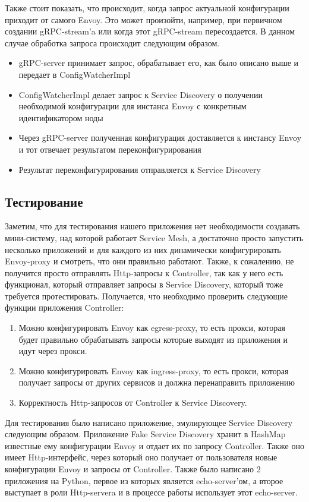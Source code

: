 Также стоит показать, что происходит, когда запрос актуальной конфигурации приходит от самого Envoy. Это может произойти, например, при первичном создании gRPC-stream'a или когда этот gRPC-stream пересоздается. В данном случае обработка запроса происходит следующим образом.

\begin{itemize}
	\item gRPC-server принимает запрос, обрабатывает его, как было описано выше и передает в ConfigWatcherImpl
	\item ConfigWatcherImpl делает запрос к Service Discovery о получении необходимой конфигурации для инстанса Envoy с конкретным идентификатором ноды
	\item Через gRPC-server полученная конфигурация доставляется к инстансу Envoy и тот отвечает результатом переконфигурирования
	\item Результат переконфигурирования отправляется к Service Discovery
\end{itemize}
 
 \subsection{Тестирование}
 
 Заметим, что для тестирования нашего приложения нет необходимости создавать мини-систему, над которой работает Service Mesh, а достаточно просто запустить несколько приложений и для каждого из них динамически конфигурировать Envoy-proxy и смотреть, что они правильно работают. Также, к сожалению, не получится  просто отправлять Http-запросы к Controller, так как у него есть функционал, который отправляет запросы в Service Discovery, который тоже требуется протестировать. Получается, что необходимо проверить следующие функции приложения Controller:
 
 \begin{enumerate}
 	\item Можно конфигурировать Envoy как egress-proxy, то есть прокси, которая будет правильно обрабатывать запросы которые выходят из приложения и идут через прокси.
 	\item Можно конфигурировать Envoy как ingress-proxy, то есть прокси, которая получает запросы от других сервисов и должна перенаправить приложению
 	\item Корректность Http-запросов от Controller к Service Discovery.
 \end{enumerate}
 
 Для тестирования было написано приложение, эмулирующее Service Discovery следующим образом. Приложение Fake Service Discovery хранит в HashMap известные ему конфигурации Envoy и отдает их по запросу Controller. Также оно имеет Http-интерфейс, через который оно получает от пользователя новые конфигурации Envoy и запросы от Controller. Также было написано 2  приложения на Python, первое из которых является echo-server'ом, а второе выступает в роли Http-servera и в процессе работы использует этот echo-server.

